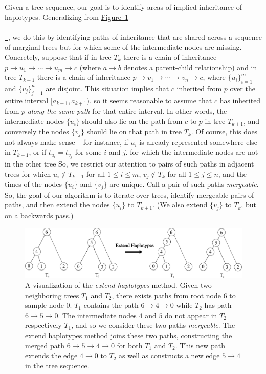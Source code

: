 \documentclass[10pt,twoside,lineno]{gsajnl}
\newcommand*{\figref}[2][]{%
	\hyperref[{#2}]{%
		Figure~\ref*{#2}%
		\ifx\\#1\\%
		\else
		\,#1%
		\fi
	}%
}
\begin{document}
Given a tree sequence, our goal is to
identify areas of implied inheritance of haplotypes.
Generalizing from \figref{fig:extending_diagram},
we do this by identifying paths of inheritance that are shared across a sequence of marginal trees
but for which some of the intermediate nodes are missing.
Concretely, suppose that 
if in tree $T_k$ there is a chain of inheritance
$p \to u_1 \to \cdots \to u_m \to c$
(where $a \to b$ denotes a parent-child relationship)
and in tree $T_{k+1}$ there is a chain of inheritance
$p \to v_1 \to \cdots \to v_n \to c$,
where $\{u_i\}_{i=1}^m$ and $\{v_j\}_{j=1}^n$ are disjoint.
This situation implies that $c$ inherited from $p$ over the entire interval $[a_{k-1}, a_{k+1})$,
so it seems reasonable to assume that $c$ has inherited from $p$ \emph{along the same path} for that entire interval.
In other words, the intermediate nodes $\{u_i\}$ should also lie on the path from $c$ to $p$ in tree $T_{k+1}$,
and conversely the nodes $\{v_j\}$ should lie on that path in tree $T_k$.
Of course, this does not always make sense --
for instance, if $u_i$ is already represented somewhere else in $T_{k+1}$,
or if $t_{u_i} = t_{v_j}$ for some $i$ and $j$.
for which the intermediate nodes are not in the other tree
So, we restrict our attention to pairs of such paths in adjacent trees
for which
$u_i \notin T_{k+1}$ for all $1 \le i \le m$,
$v_j \notin T_k$ for all $1 \le j \le n$,
and the times of the nodes $\{u_i\}$ and $\{v_j\}$ are unique.
Call a pair of such paths \emph{mergeable}.
So, the goal of our algorithm is to iterate over trees,
identify mergeable pairs of paths,
and then extend the nodes $\{u_i\}$ to $T_{k+1}$.
(We also extend $\{v_j\}$ to $T_k$, but on a backwards pass.)

\begin{figure}[!ht]
\begin{center}
	\includegraphics[width=5in]{edge_extend_method.pdf}
\end{center}
\caption{A visualization of the \textit{extend haplotypes} method. Given two neighboring trees $T_1$ and $T_2$, there exists paths from root node $6$ to sample node $0$. $T_1$ contains the path $6\to 4\to 0$ while $T_2$ has path $6\to 5\to 0$. The intermediate nodes $4$ and $5$ do not appear in $T_2$ respectively $T_1$, and so we consider these two paths \textit{mergeable}. The extend haplotypes method joins these two paths, constructing the merged path $6\to 5\to 4\to 0$ for both $T_1$ and $T_2$. This new path extends the edge $4\to 0$ to $T_2$ as well as constructs a new edge $5\to 4$ in the tree sequence.
    \label{fig:extending_diagram}
}
\end{figure}
\end{document}
